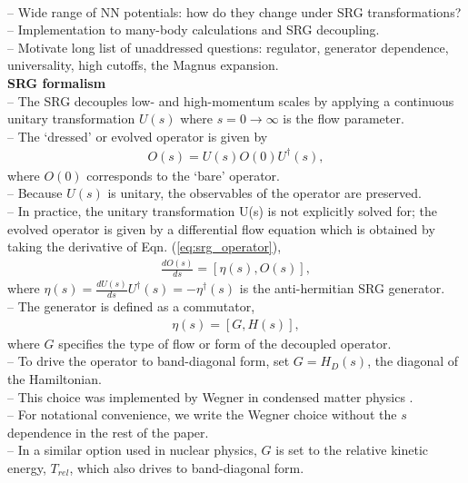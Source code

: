 \documentclass[preprintnumbers,floatfix,aps,prc,preprint,nofootinbib]{revtex4-1}
\begin{document}
\\
-- Wide range of NN potentials: how do they change under SRG transformations?
\\
-- Implementation to many-body calculations and SRG decoupling.
\\
-- Motivate long list of unaddressed questions: regulator, generator dependence, universality, high cutoffs, the Magnus expansion.
\\
\textbf{SRG formalism}
\\
-- The SRG decouples low- and high-momentum scales by applying a continuous unitary transformation $U(s)$ where $s=0 \rightarrow \infty$ is the flow parameter.
\\
-- The `dressed' or evolved operator is given by
%
\begin{eqnarray}
	\label{eq:srg_operator}
	O(s) = U(s) O(0) U^{\dagger}(s),
\end{eqnarray}
%
where $O(0)$ corresponds to the `bare' operator.
\\
-- Because $U(s)$ is unitary, the observables of the operator are preserved.
\\
-- In practice, the unitary transformation U(s) is not explicitly solved for; the evolved operator is given by a differential flow equation which is obtained by taking the derivative of Eqn. (\ref{eq:srg_operator}),
%
\begin{eqnarray}
	\label{eq:srg_flow}
	\frac{dO(s)}{ds} = [\eta(s), O(s)],
\end{eqnarray}
%
where $\eta(s)=\frac{dU(s)}{ds} U^{\dagger}(s) = -\eta^{\dagger}(s)$ is the anti-hermitian SRG generator.
\\
-- The generator is defined as a commutator,
%
\begin{eqnarray}
	\label{eq:srg_generator}
	\eta(s) = [G, H(s)],
\end{eqnarray}
%
where $G$ specifies the type of flow or form of the decoupled operator.
\\
-- To drive the operator to band-diagonal form, set $G=H_D(s)$, the diagonal of the Hamiltonian.
\\
-- This choice was implemented by Wegner in condensed matter physics \cite{Wegner:1994ab}.
\\
-- For notational convenience, we write the Wegner choice without the $s$ dependence in the rest of the paper.
\\
-- In a similar option used in nuclear physics, $G$ is set to the relative kinetic energy, $T_{rel}$, which also drives to band-diagonal form.
\end{document}
